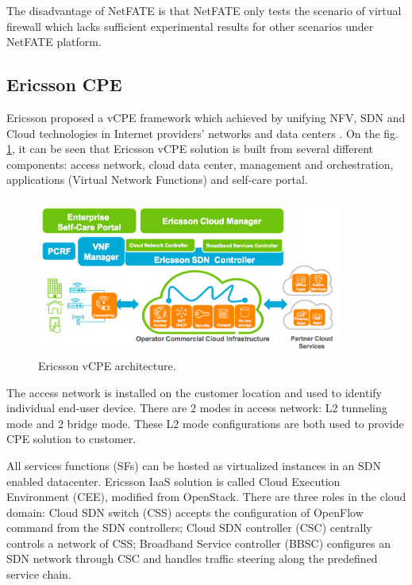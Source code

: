 The disadvantage of NetFATE is that NetFATE only tests the scenario of virtual firewall which lacks sufficient experimental results for other scenarios under NetFATE platform.




\subsection{Ericsson CPE}
Ericsson proposed a vCPE framework which achieved by unifying NFV, SDN and Cloud technologies in Internet providers’ networks and data centers \cite{ericsson-vcpe}.
On the fig. \ref{fig:ericsson_archi}, it can be seen that Ericsson vCPE solution is built from several different components: access network, cloud data center, management and orchestration, applications (Virtual Network Functions) and self-care portal.

\begin{figure}[!ht]
\centering
\includegraphics[width=0.9\textwidth]{./fig/ericsson_archi.png}
\caption{Ericsson vCPE architecture. \cite{ericsson-vcpe}}
\label{fig:ericsson_archi}
\end{figure}

The access network is installed on the customer location and used to identify individual end-user device.
There are 2 modes in access network: L2 tunneling mode and 2 bridge mode.
These L2 mode configurations are both used to provide CPE solution to customer.

All services functions (SFs) can be hosted as virtualized instances in an SDN enabled datacenter.
Ericsson IaaS solution is called Cloud Execution Environment (CEE), modified from OpenStack.
There are three roles in the cloud domain:
Cloud SDN switch (CSS) accepts the configuration of OpenFlow command from the SDN controllers;
Cloud SDN controller (CSC) centrally controls a network of CSS;
Broadband Service controller (BBSC) configures an SDN network through CSC and handles traffic steering along the predefined service chain.

